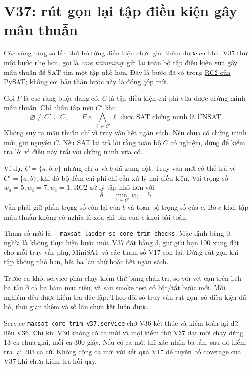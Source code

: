 \documentclass[11pt,a4paper]{article}
\newcommand{\file}[1]{\nolinkurl{#1}}
\begin{document}
\section{V37: rút gọn lại tập điều kiện gây mâu thuẫn}

Các vòng tăng số lần thử bỏ từng điều kiện chưa giải thêm được ca khó.
V37 thử một bước nhẹ hơn, gọi là \emph{core trimming}: gửi lại toàn bộ
tập điều kiện vừa gây mâu thuẫn để SAT tìm một tập nhỏ hơn. Đây là bước
đã có trong \href{https://pysathq.github.io/docs/html/api/examples/rc2.html\#pysat.examples.rc2.RC2.trim_core}{RC2 của PySAT}; không coi bản thân bước này là đóng góp mới.

Gọi $F$ là các ràng buộc đang có, $C$ là tập điều kiện chi phí vừa được
chứng minh mâu thuẫn. Chỉ nhận tập mới $C'$ khi:
\[
 \varnothing\ne C'\subseteq C,
 \qquad F\land\bigwedge_{\ell\in C'}\ell
 \text{ được SAT chứng minh là UNSAT.}
\]
Không suy ra mâu thuẫn chỉ vì truy vấn hết ngân sách. Nếu chưa có chứng
minh mới, giữ nguyên $C$. Nếu SAT lại trả lời rằng toàn bộ $C$ có nghiệm,
dừng để kiểm tra lỗi vì điều này trái với chứng minh vừa có.

Ví dụ, $C=\{a,b,c\}$ nhưng chỉ $a$ và $b$ đã xung đột. Truy vấn mới có
thể trả về $C'=\{a,b\}$; khi đó bộ đếm chi phí chỉ cần xử lý hai điều kiện.
Với trọng số $w_a=5,w_b=7,w_c=1$, RC2 xử lý tập nhỏ hơn với
\[
 \delta=\min_{\ell\in C'}w_\ell=5.
\]
Vẫn phải giữ phần trọng số còn lại của $b$ và toàn bộ trọng số của $c$.
Bỏ $c$ khỏi tập mâu thuẫn không có nghĩa là xóa chi phí của $c$ khỏi bài toán.

Tham số mới là \file{--maxsat-ladder-sc-core-trim-checks}. Mặc định bằng
0, nghĩa là không thực hiện bước mới. V37 đặt bằng 3, giữ giới hạn 100
xung đột cho mỗi truy vấn phụ, MiniSAT và các tham số V17 còn lại.
Dừng rút gọn khi tập không nhỏ hơn, hết ba lần thử hoặc hết ngân sách.

Trước ca khó, service phải chạy kiểm thử bảng chân trị, so với vét cạn
trên lịch ba tàu ở cả ba hàm mục tiêu, và sáu smoke test có bật/tắt bước
mới. Mỗi nghiệm đều được kiểm tra độc lập. Theo dõi số truy vấn rút gọn,
số điều kiện đã bỏ, thời gian thêm và số lần chưa kết luận được.

Service \file{maxsat-core-trim-v37.service} chờ V36 kết thúc và kiểm toán
lại dữ liệu V36. Chỉ khi V36 không có ca mới và mọi kiểm thử V37 đạt mới
chạy đúng 13 ca chưa giải, mỗi ca 300 giây. Nếu có ca mới thì xác nhận
ba lần, sau đó kiểm tra lại 203 ca cũ. Không cộng ca mới với kết quả V17
để tuyên bố coverage của V37 khi chưa kiểm tra hồi quy.
\end{document}
